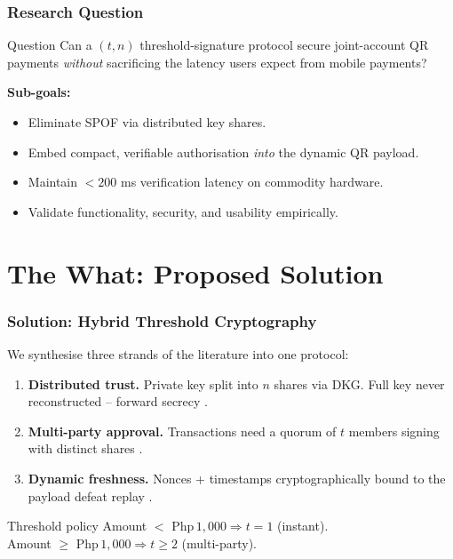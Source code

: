 \documentclass{beamer}
\newcommand{\HL}[1]{\textcolor{emphasis}{#1}}
\begin{document}
\begin{frame}
  \frametitle{Research Question}
  \begin{block}{Question}
    Can a \HL{$(t,n)$ threshold-signature protocol} secure joint-account QR payments \textit{without} sacrificing the latency users expect from mobile payments?
  \end{block}
  \vspace{0.2cm}
  \textbf{Sub-goals:}
  \begin{itemize}
      \item Eliminate SPOF via distributed key shares.
      \item Embed compact, verifiable authorisation \textit{into} the dynamic QR payload.
      \item Maintain $<200$ ms verification latency on commodity hardware.
      \item Validate functionality, security, and usability empirically.
  \end{itemize}
\end{frame}

\section{The What: Proposed Solution}

\begin{frame}
  \frametitle{Solution: Hybrid Threshold Cryptography}
  We synthesise three strands of the literature into one protocol:
  \vspace{0.2cm}
  \begin{enumerate}
      \item \textbf{Distributed trust.} Private key split into $n$ shares via DKG. Full key \HL{never reconstructed} -- forward secrecy \cite{shamir1979, ruffing2014}.
      \item \textbf{Multi-party approval.} Transactions need a quorum of $t$ members signing with distinct shares \cite{desmedt1988, gennaro2007}.
      \item \textbf{Dynamic freshness.} Nonces + timestamps cryptographically bound to the payload defeat replay \cite{boneh2001}.
  \end{enumerate}
  \vspace{0.2cm}
  \begin{block}{Threshold policy}
    Amount $< $ Php\,$1{,}000 \Rightarrow t = 1$ (instant). \\
    Amount $\ge $ Php\,$1{,}000 \Rightarrow t \ge 2$ (multi-party).
  \end{block}
\end{frame}
\end{document}
